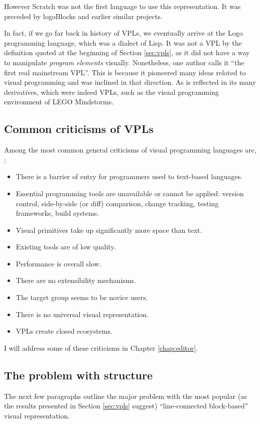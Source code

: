 However Scratch was not the first language to use this representation. It was preceded by logoBlocks and earlier similar projects\cite{vpl_history}.

In fact, if we go far back in history of VPLs, we eventually arrive at the Logo programming language, which was a dialect of Lisp\cite{logo_history, logo_wikipedia}. It was not a VPL by the definition quoted at the beginning of Section \ref{sec:vpls}, as it did not have a way to manipulate \textit{program elements} visually. Nonetheless, one author calls it ``the first real mainstream VPL''\cite{vpl_infograph}. This is because it pioneered many ideas related to visual programming and was inclined in that direction. As is reflected in its many derivatives, which were indeed VPLs\cite{cricket_logo}, such as the visual programming environment of LEGO Mindstorms\cite{mindstorms_history, mindstorms_wikipedia, mindstorms_site}.

\subsection{Common criticisms of VPLs}\label{sub:vpl_crit}
Among the most common general criticisms of visual programming languages are\cite{vp_vs_tp, vp_unbelievable, vp_advantages_disadvantages, deutsch_wikipedia}, \cite[Section~Criticism]{labview_wikipedia}:
\begin{itemize}
\item There is a barrier of entry for programmers used to text-based languages.
\item Essential programming tools are unavailable or cannot be applied: version control, side-by-side (or diff) comparison, change tracking, testing frameworks, build systems.
\item Visual primitives take up significantly more space than text.
\item Existing tools are of low quality.
\item Performance is overall slow.
\item There are no extensibility mechanisms.
\item The target group seems to be novice users.
\item There is no universal visual representation.
\item VPLs create closed ecosystems.
\end{itemize}

I will address some of these criticisms in Chapter \ref{chap:editor}.

\subsection{The problem with structure}
The next few paragraphs outline the major problem with the most popular (as the results presented in Section \ref{sec:vpls} suggest) ``line-connected block-based'' visual representation.

